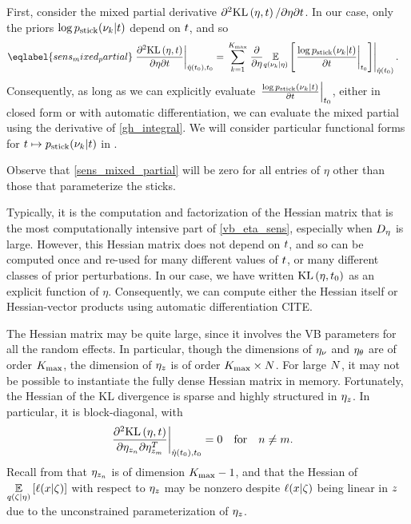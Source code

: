 First, consider the mixed partial derivative $\partial^2 \mathrm{KL}\left(\eta, t\right) /
\partial \eta \partial t$.  In our case, only the priors $\log p_{\mathrm{stick}}(\nu_k
\vert t)$ depend on $t$, and so
%
\begin{align}\eqlabel{sens_mixed_partial}
%
\fracat{\partial^2 \KL{\eta, \t}}
       {\partial \eta \partial \t}
       {\etaopt(\t_0), \t_0} ={}&
\sum_{\k=1}^{\kmax}
    \evalat{
        \frac{\partial}{\partial\eta}
        \expect{\q(\nu_\k \vert \eta)}
               {\fracat{\log \pstick(\nu_\k \vert \t)}{\partial \t}{\t_0}
               }
        }
        {\etaopt(\t_0)}.
%
\end{align}
%
Consequently, as long as we can explicitly evaluate $\left.\frac{\log p_{\mathrm{stick}}(\nu_k
\vert t)}{\partial t}\right\vert_{t_0} $, either in closed form or with automatic
differentiation, we can evaluate the mixed partial using the derivative of
\eqref{gh_integral}.  We will consider particular functional forms for
$t \mapsto p_{\mathrm{stick}}(\nu_k \vert t)$ in .

Observe that \eqref{sens_mixed_partial} will be zero for all entries of
$\eta$ other than those that parameterize the sticks.

Typically, it is the computation and factorization of the Hessian matrix that is
the most computationally intensive part of \eqref{vb_eta_sens}, especially when
$D_{\eta}$ is large.  However, this Hessian matrix does not depend on $t$, and
so can be computed once and re-used for many different values of $t$, or many
different classes of prior perturbations.  In our case, we have written
$\mathrm{KL}\left(\eta, t_0\right)$ as an explicit function of $\eta$.  Consequently, we can
compute either the Hessian itself or Hessian-vector products using automatic
differentiation CITE.

The Hessian matrix may be quite large, since it involves the VB parameters for
all the random effects.  In particular, though the dimensions of $\eta_{\nu}$ and
$\eta_{\theta}$ are of order ${K_{\mathrm{max}}}$, the dimension of $\eta_{z}$ is of order ${K_{\mathrm{max}}}
\times N$.  For large $N$, it may not be possible to instantiate the fully
dense Hessian matrix in memory.  Fortunately, the Hessian of the KL divergence
is sparse and highly structured in $\eta_{z}$.  In particular, it is
block-diagonal, with
%
\begin{align*}
%
\fracat{\partial^2 \KL{\eta, \t}}
       {\partial \eta_{\z_{n}} \partial \eta_{\z_{m}}^T}
       {\etaopt(\t_0), \t_0} ={}& 0 \mathtxt{for}n\ne m.
%
\end{align*}
%
Recall from  that $\eta_{z_n}$ is of dimension ${K_{\mathrm{max}}} -
1$, and that the Hessian of $\underset{q(\zeta \vert \eta)}{\mathbb{E}}\left[\ell(x \vert
\zeta)\right]$ with respect to $\eta_{z}$ may be nonzero despite $\ell(x \vert \zeta)$
being linear in $z$ due to the unconstrained parameterization of $\eta_{z}$.


%
